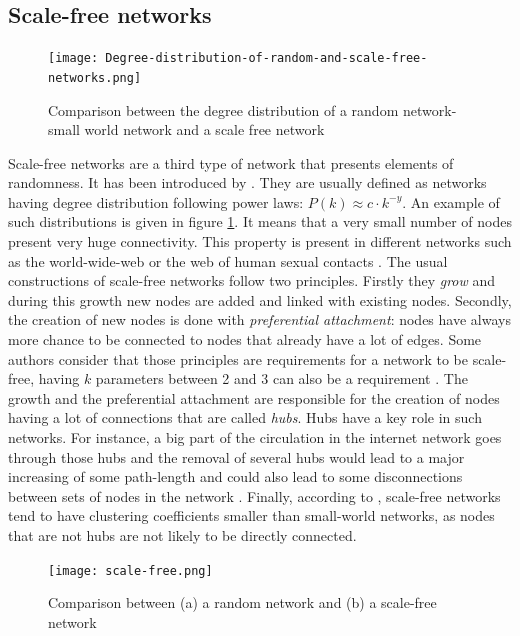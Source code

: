 \documentclass[a4paper, 12pt]{report}
\begin{document}
\subsection{Scale-free networks}
\label{scale-free-section}
\begin{figure}
\centering
\texttt{[image: Degree-distribution-of-random-and-scale-free-networks.png]}
\caption{Comparison between the degree distribution of a random network- small world network and a scale free network \citep{scale-free_degree}}
\label{scale-free_degree}
\end{figure}

Scale-free networks are a third type of network that presents elements of randomness. It has been introduced by \cite{scale-free}. They are usually defined as networks having degree distribution following power laws: $ P(k) \approx c \cdot k^{-y}$. An example of such distributions is given in figure \ref{scale-free_degree}. It means that a very small number of nodes present very huge connectivity. This property is present in different networks such as the world-wide-web \citep{www} or the web of human sexual contacts \citep{sexual}. The usual constructions of scale-free networks follow two principles. Firstly they \textit{grow} and during this growth new nodes are added and linked with existing nodes. Secondly, the creation of new nodes is done with \textit{preferential attachment}: nodes have always more chance to be connected to nodes that already have a lot of edges. Some authors consider that those principles are requirements for a network to be scale-free, having $k$ parameters between 2 and 3 can also be a requirement \citep{sf_rare}. The growth and the preferential attachment are responsible for the creation of nodes having a lot of connections that are called \textit{hubs}. Hubs have a key role in such networks. For instance, a big part of the circulation in the internet network goes through those hubs and the removal of several hubs would lead to a major increasing of some path-length and could also lead to some disconnections between sets of nodes in the network \citep{general_scale-free}. Finally, according to \cite{SMVSSF}, scale-free networks tend to have clustering coefficients smaller than small-world networks, as nodes that are not hubs are not likely to be directly connected. \citep{general_scale_free2}\\

\begin{figure}
\centering
\texttt{[image: scale-free.png]}
\caption{Comparison between (a) a random network and (b) a scale-free network \citep{complex_networks}}
\label{scale-free_pictures}
\end{figure}
\end{document}
